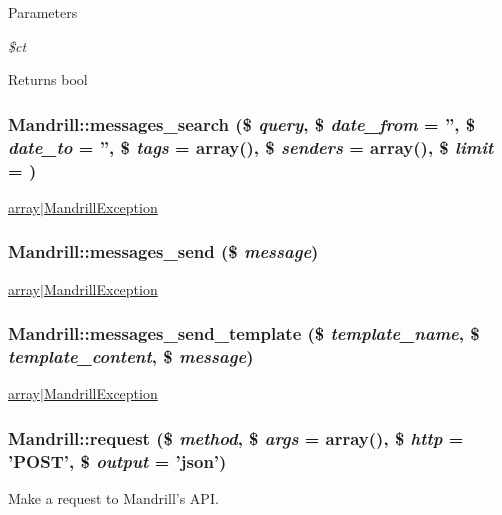 \begin{DoxyParams}{Parameters}
\item[{\em \$ct}]\end{DoxyParams}
\begin{DoxyReturn}{Returns}
bool 
\end{DoxyReturn}
\hypertarget{classMandrill_a95e3c655d8a59f87e1df15447baa1130}{
\subsubsection[{messages\_\-search}]{\setlength{\rightskip}{0pt plus 5cm}Mandrill::messages\_\-search (\$ {\em query}, \/  \$ {\em date\_\-from} = {\ttfamily ''}, \/  \$ {\em date\_\-to} = {\ttfamily ''}, \/  \$ {\em tags} = {\ttfamily array()}, \/  \$ {\em senders} = {\ttfamily array()}, \/  \$ {\em limit} = {})}}
\label{classMandrill_a95e3c655d8a59f87e1df15447baa1130}
\hyperlink{}{array$|$MandrillException }\hypertarget{classMandrill_a3254fb19f69dfec82493ee05bbab017d}{
\subsubsection[{messages\_\-send}]{\setlength{\rightskip}{0pt plus 5cm}Mandrill::messages\_\-send (\$ {\em message})}}
\label{classMandrill_a3254fb19f69dfec82493ee05bbab017d}
\hyperlink{}{array$|$MandrillException }\hypertarget{classMandrill_ab694c84b3e13dacaf6357b09f124d72f}{
\subsubsection[{messages\_\-send\_\-template}]{\setlength{\rightskip}{0pt plus 5cm}Mandrill::messages\_\-send\_\-template (\$ {\em template\_\-name}, \/  \$ {\em template\_\-content}, \/  \$ {\em message})}}
\label{classMandrill_ab694c84b3e13dacaf6357b09f124d72f}
\hyperlink{}{array$|$MandrillException }\hypertarget{classMandrill_aa521bfc424f451b295ded1c916801afb}{
\subsubsection[{request}]{\setlength{\rightskip}{0pt plus 5cm}Mandrill::request (\$ {\em method}, \/  \$ {\em args} = {\ttfamily array()}, \/  \$ {\em http} = {\ttfamily 'POST'}, \/  \$ {\em output} = {\ttfamily 'json'})}}
\label{classMandrill_aa521bfc424f451b295ded1c916801afb}
Make a request to Mandrill's API.

